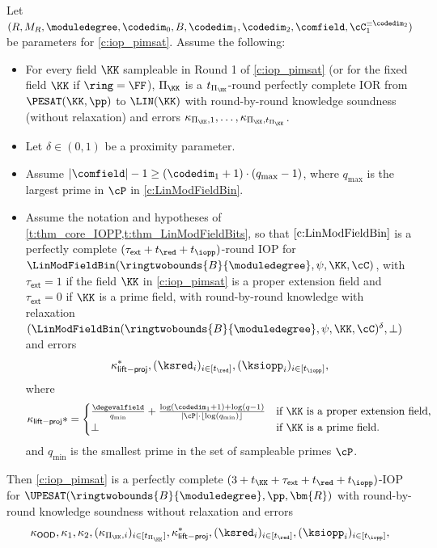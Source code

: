 \begin{theorem} \label{t:thm_iop_pimsat}  Let $(R,M_R, \moduledegree, \codedim_0, B, \codedim_1, \codedim_2, \comfield, \cC_1^{\equiv \codedim_2})$ be parameters for \cref{c:iop_pimsat}. Assume the following:
\begin{itemize}
\item For every field $\KK$ sampleable in Round 1 of \cref{c:iop_pimsat} (or for the fixed field $\KK$ if $\ring = \FF$), $\Pi_{\KK}$ is a $t_{\Pi_{\KK}}$-round perfectly complete IOR from $\PESAT(\KK, \pp)$ to $\LIN(\KK)$ with round-by-round knowledge soundness (without relaxation) and errors $\kappa_{\Pi_\KK, 1}, \ldots, \kappa_{\Pi_\KK, t_{\Pi_\KK}}$. 
\item Let $\delta\in (0,1)$ be a proximity parameter.
\item Assume $|\comfield|-1 \geq (\codedim_1+1)\cdot (q_{\max} -1)$, where $q_{\max}$ is the largest prime in $\cP$ in \cref{c:LinModFieldBin}.
\item Assume the notation and hypotheses of \cref{t:thm_core_IOPP,t:thm_LinModFieldBits}, so that  $\cref{c:LinModFieldBin}$ is a perfectly complete $(\tau_{\mathsf{ext}}+t_\red +t_\iopp)$-round IOP for $\LinModFieldBin(\ringtwobounds{B}{\moduledegree},\psi,\KK, \cC)$, with $\tau_{\mathsf{ext}}=1$ if the field $\KK$ in \cref{c:iop_pimsat} is a proper extension field and $\tau_{\mathsf{ext}}=0$ if $\KK$ is a prime field, with round-by-round knowledge with relaxation $(\LinModFieldBin(\ringtwobounds{B}{\moduledegree},\psi,\KK, \cC)^\delta,\bot)$ and errors $$\kappa_{\mathsf{lift-proj}}^*, (\ksred_i)_{i\in [t_\red]}, (\ksiopp_i)_{i\in [t_\iopp]},$$ where
    $$
    \kappa_{\mathsf{lift-proj}}* = \begin{cases}\frac{\degevalfield}{q_{\min}} + \frac{\log(\codedim_1 +1) + \log(q-1)}{|\cP|\cdot \lfloor\log(q_{\min})\rfloor} & \text{if } \KK \text{ is a proper extension field,}\\
    \bot & \text{if } \KK \text{ is a prime field.}
    \end{cases}
    $$
    and $q_{\min}$ is the smallest prime in the set of sampleable primes $\cP$. 
\end{itemize}
    Then \cref{c:iop_pimsat} is a perfectly complete $(3+t_\KK + \tau_{\mathsf{ext}} + t_{\red} +t_\iopp)$-IOP for $\UPESAT(\ringtwobounds{B}{\moduledegree},\pp,\bm{R})$ with round-by-round knowledge soundness without relaxation and errors 
    $$
    \kappa_{\mathsf{OOD}}, \kappa_1, \kappa_2, (\kappa_{\Pi_\KK,i})_{i\in [t_{\Pi_\KK}]}, \kappa_{\mathsf{lift-proj}}^*, (\ksred_i)_{i\in [t_\red]}, (\ksiopp_i)_{i\in [t_\iopp]}, 
$$
\end{theorem}
